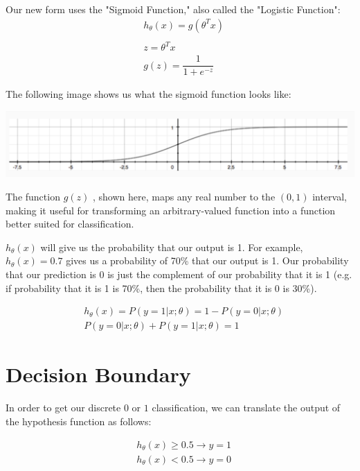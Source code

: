 \documentclass[10pt,a4paper,UTF8]{article}
\begin{document}
Our new form uses the "Sigmoid Function," also called the "Logistic Function":
\begin{align*}& h_\theta (x) = g ( \theta^T x ) \\ \\& z = \theta^T x \\& g(z) = \dfrac{1}{1 + e^{-z}}\end{align*}

The following image shows us what the sigmoid function looks like:

\begin{center}
\includegraphics[width=.9\linewidth]{../../img/computer_ng/20171008logisticFunction.png}
\end{center}

The function \(g(z)\) , shown here, maps any real number to the \((0,1)\)  interval, making it useful for transforming an arbitrary-valued function into a function better suited for classification.

\(h_{\theta}(x)\) will give us the probability that our output is 1. For example,\(h_{\theta}(x)=0.7\) gives us a probability of 70\% that our output is 1. Our probability that our prediction is 0 is just the complement of our probability that it is 1 (e.g. if probability that it is 1 is 70\%, then the probability that it is 0 is 30\%).

\begin{align*}& h_\theta(x) = P(y=1 | x ; \theta) = 1 - P(y=0 | x ; \theta) \\& P(y = 0 | x;\theta) + P(y = 1 | x ; \theta) = 1\end{align*}
\section{Decision Boundary}
\label{sec:org34d6382}


In order to get our discrete \(0\) or \(1\) classification, we can translate the output of the hypothesis function as follows:

\begin{align*}& h_\theta(x) \geq 0.5 \rightarrow y = 1 \\& h_\theta(x) < 0.5 \rightarrow y = 0 \\\end{align*}
\end{document}
